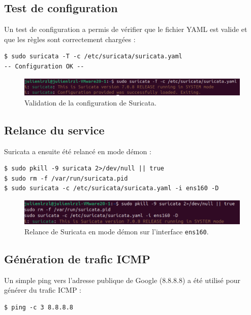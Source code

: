 \subsection{Test de configuration}
Un test de configuration a permis de vérifier que le fichier YAML est valide et que les règles sont correctement chargées :

\begin{verbatim}
$ sudo suricata -T -c /etc/suricata/suricata.yaml
-- Configuration OK --
\end{verbatim}

\begin{figure}[H]
    \centering
    \includegraphics[width=0.9\linewidth]{assets/figures/suricata-test.png}
    \caption{Validation de la configuration de Suricata.}
\end{figure}

\subsection{Relance du service}
Suricata a ensuite été relancé en mode démon :

\begin{verbatim}
$ sudo pkill -9 suricata 2>/dev/null || true
$ sudo rm -f /var/run/suricata.pid
$ sudo suricata -c /etc/suricata/suricata.yaml -i ens160 -D
\end{verbatim}

\begin{figure}[H]
    \centering
    \includegraphics[width=0.9\linewidth]{assets/figures/suricata-restart.png}
    \caption{Relance de Suricata en mode démon sur l'interface \texttt{ens160}.}
\end{figure}

\subsection{Génération de trafic ICMP}
Un simple ping vers l’adresse publique de Google (8.8.8.8) a été utilisé pour générer du trafic ICMP :

\begin{verbatim}
$ ping -c 3 8.8.8.8
\end{verbatim}

